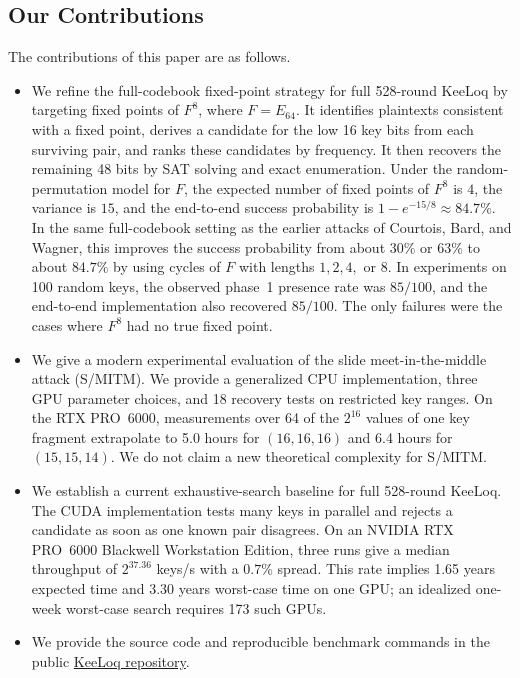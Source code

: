 \documentclass[version=preprint]{iacrcc}
\begin{document}
\subsection{Our Contributions}

The contributions of this paper are as follows.

\begin{itemize}
  \item We refine the full-codebook fixed-point strategy for full 528-round KeeLoq by targeting fixed points of $F^8$, where $F = E_{64}$.
  It identifies plaintexts consistent with a fixed point, derives a candidate for the low 16 key bits from each surviving pair, and ranks these candidates by frequency.
  It then recovers the remaining 48 bits by SAT solving and exact enumeration.
  Under the random-permutation model for $F$, the expected number of fixed points of $F^8$ is $4$, the variance is $15$, and the end-to-end success probability is $1 - e^{-15/8} \approx 84.7\%$.
  In the same full-codebook setting as the earlier attacks of Courtois, Bard, and Wagner, this improves the success probability from about $30\%$ or $63\%$ to about $84.7\%$ by using cycles of $F$ with lengths $1,2,4,$ or $8$.
  In experiments on 100 random keys, the observed phase~1 presence rate was $85/100$, and the end-to-end implementation also recovered $85/100$.
  The only failures were the cases where $F^8$ had no true fixed point.
  \item We give a modern experimental evaluation of the slide meet-in-the-middle attack (S/MITM).
  We provide a generalized CPU implementation, three GPU parameter choices, and 18 recovery tests on restricted key ranges.
  On the RTX PRO~6000, measurements over 64 of the $2^{16}$ values of one key fragment extrapolate to 5.0 hours for $(16,16,16)$ and 6.4 hours for $(15,15,14)$.
  We do not claim a new theoretical complexity for S/MITM.
  \item We establish a current exhaustive-search baseline for full 528-round KeeLoq.
  The CUDA implementation tests many keys in parallel and rejects a candidate as soon as one known pair disagrees.
  On an NVIDIA RTX PRO~6000 Blackwell Workstation Edition, three runs give a median throughput of $2^{37.36}$ keys/s with a $0.7\%$ spread.
  This rate implies 1.65 years expected time and 3.30 years worst-case time on one GPU; an idealized one-week worst-case search requires 173 such GPUs.
  \item We provide the source code and reproducible benchmark commands in the public \href{https://github.com/hadipourh/KeeLoq}{KeeLoq repository}.
\end{itemize}
\end{document}
